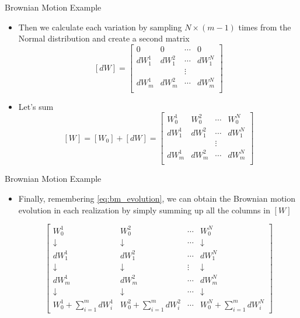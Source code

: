 \documentclass{beamer}
\begin{document}
\begin{frame}{Brownian Motion Example}
\begin{itemize}
    \item Then we calculate each variation by sampling $N\times (m-1)$ times from the Normal distribution and create a second matrix 
    $$
    [dW] =
    \begin{bmatrix}
    0 & 0 & \cdots & 0 \\
    dW^1_1 & dW^2_1 & \cdots & dW^N_1 \\
     &  & \vdots &   \\
    dW^1_{m} & dW^2_{m} & \cdots & dW^N_{m} \\
    \end{bmatrix}
    $$  
    \item Let's sum 
    $$[W] = [W_0] + [dW] =
    \begin{bmatrix}
    W^1_0 & W^2_0 & \cdots & W^N_0 \\
    dW^1_1 & dW^2_1 & \cdots & dW^N_1 \\
     &  & \vdots &   \\
    dW^1_{m} & dW^2_{m} & \cdots & dW^N_{m} \\
    \end{bmatrix}
    $$  
\end{itemize}
\end{frame}

\begin{frame}{Brownian Motion Example}
\begin{itemize}
    \item Finally, remembering \cref{eq:bm_evolution}, we can obtain the Brownian motion evolution in each realization by simply summing up all the columns in $[W]$

\[\left[
\begin{array}{cccc}
W^1_0 & W^2_0 & \cdots & W^N_0 \\
\downarrow & \downarrow & \cdots & \downarrow \\
dW^1_1 & dW^2_1 & \cdots & dW^N_1 \\
\downarrow & \downarrow & \vdots & \downarrow \\
dW^1_{m} & dW^2_{m} & \cdots & dW^N_{m} \\
\downarrow & \downarrow & \cdots & \downarrow \\
W^1_0+\sum\limits_{i=1}^{m} dW^1_i & W^2_0+\sum\limits_{i=1}^{m} dW^2_i & \cdots & W^N_0+\sum\limits_{i=1}^{m} dW^N_i
\end{array}\right]
\]
\end{itemize}
\end{frame}
\end{document}
